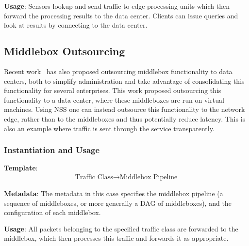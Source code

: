 \textbf{Usage}: Sensors lookup and send traffic to edge processing units which then forward the processing results
to the data center. Clients can issue queries and look at results by connecting to the data center.

\subsection{Middlebox Outsourcing}

Recent work~\cite{sylviamidbox} has also proposed outsourcing middlebox functionality to data centers, both to
simplify administration and take advantage of consolidating this functionality for several enterprises. This work
proposed outsourcing this functionality to a data center, where these middleboxes are run on virtual machines. Using
NSS one can instead outsource this functionality to the network edge, rather than to the middleboxes and thus potentially reduce latency. This is also an example where traffic is sent through the service transparently.

\subsubsection*{Instantiation and Usage}
\indent\indent\textbf{Template}:
\begin{align*}
\text{Traffic Class} \rightarrow \text{Middlebox Pipeline}
\end{align*}

\textbf{Metadata}: The metadata in this case specifies the middlebox pipeline (a sequence of middleboxes, or more generally a DAG of middleboxes), and the configuration of each middlebox.

\textbf{Usage}: All packets belonging to the specified traffic class are forwarded to the middlebox, which then 
processes this traffic and forwards it as appropriate. 

